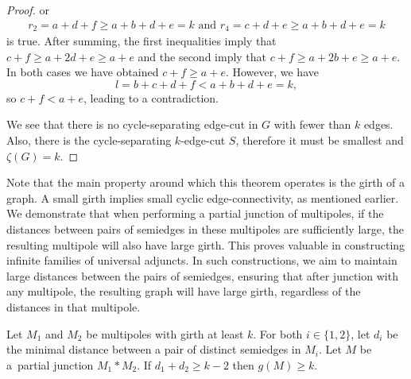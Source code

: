 \documentclass[12pt, twoside]{book}
\begin{document}
\begin{proof}
	or
	\begin{align*}
		r_2 =a+d+f \geq a+b+d+e=k \text{ and } r_4 =c+d+e\geq a+b+d+e=k
	\end{align*}
	is true. After summing, the first inequalities imply that $c+f\geq a+2d+e\geq a+e$ and the second imply that $c+f\geq a+2b+e\geq a+e$. In both cases we have obtained $c+f\geq a+e$. However, we have 
	$$l=b+c+d+f<a+b+d+e=k,$$
	so $c+f<a+e$, leading to a contradiction.
	
	We see that there is no cycle-separating edge-cut in $G$ with fewer than $k$ edges. Also, there is the \mbox{cycle-separating} $k$-edge-cut $S$, therefore it must be smallest and $\zeta(G)=k$.
\end{proof}

Note that the main property around which this theorem operates is the girth of a graph. A small girth implies small cyclic edge-connectivity, as mentioned earlier. We demonstrate that when performing a partial junction of multipoles, if the distances between pairs of semiedges in these multipoles are sufficiently large, the resulting multipole will also have large girth. This proves valuable in constructing infinite families of universal adjuncts. In such constructions, we aim to maintain large distances between the pairs of semiedges, ensuring that after junction with any multipole, the resulting graph will have large girth, regardless of the distances in that multipole.

\begin{lemma}\label{lem:cyclic-multipoles-with-girth-and-distance}
	Let $M_1$ and $M_2$ be multipoles with girth at least $k$. For both $i\in\{1,2\}$, let $d_i$ be the minimal distance between a pair of distinct semiedges in $M_i$. Let $M$ be a~partial junction $M_1*M_2$. If $d_1+d_2\geq k-2$ then $g(M)\geq k$.
\end{lemma}
\end{document}
